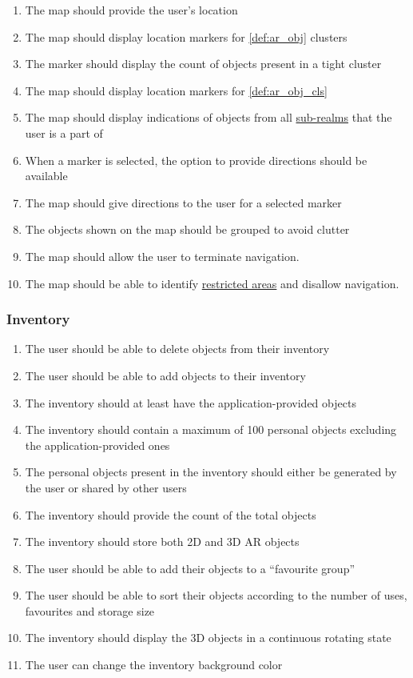 \documentclass{article}
\begin{document}
\begin{enumerate}[align=left, label=\textbf{MP-FR\arabic*:}]
    \item The map should provide the user's location
    \item The map should display location markers for \ref{def:ar_obj} clusters
    \item The marker should display the count of objects present in a tight cluster
    \item The map should display location markers for \ref{def:ar_obj_cls}
    \item The map should display indications of objects from all \hyperref[def:sub_realm]{sub-realms} that the user is a part of
    \item When a marker is selected, the option to provide directions should be available
    \item The map should give directions to the user for a selected marker
    \item The objects shown on the map should be grouped to avoid clutter
    \item The map should allow the user to terminate navigation. \\
    \item The map should be able to identify \hyperref[def:restricted_area]{restricted areas} and disallow navigation.\\
\end{enumerate}

\subsubsection{Inventory}
\label{ssub:inventory}

\begin{enumerate}[align=left, label=\textbf{IV-FR\arabic*:}]
    \item The user should be able to delete objects from their inventory
    \item The user should be able to add objects to their inventory
    \item The inventory should at least have the application-provided objects
    \item The inventory should contain a maximum of 100 personal objects excluding the application-provided ones
    \item The personal objects present in the inventory should either be generated by the user or shared by other users
    \item The inventory should provide the count of the total objects
    \item The inventory should store both 2D and 3D AR objects
    \item The user should be able to add their objects to a “favourite group”
    \item The user should be able to sort their objects according to the number of uses, favourites and storage size
    \item The inventory should display the 3D objects in a continuous rotating state
    \item The user can change the inventory background color
\end{enumerate}
\end{document}
